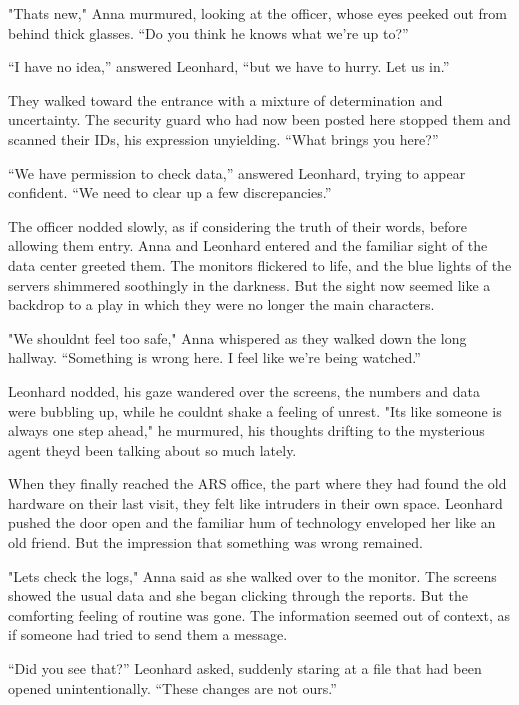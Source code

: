 \documentclass[
]{article}
\begin{document}
"That\textquotesingle s new," Anna murmured, looking at the officer,
whose eyes peeked out from behind thick glasses. ``Do you think he knows
what we're up to?''

``I have no idea,'' answered Leonhard, ``but we have to hurry. Let us
in.''

They walked toward the entrance with a mixture of determination and
uncertainty. The security guard who had now been posted here stopped
them and scanned their IDs, his expression unyielding. ``What brings you
here?''

``We have permission to check data,'' answered Leonhard, trying to
appear confident. ``We need to clear up a few discrepancies.''

The officer nodded slowly, as if considering the truth of their words,
before allowing them entry. Anna and Leonhard entered and the familiar
sight of the data center greeted them. The monitors flickered to life,
and the blue lights of the servers shimmered soothingly in the darkness.
But the sight now seemed like a backdrop to a play in which they were no
longer the main characters.

"We shouldn\textquotesingle t feel too safe," Anna whispered as they
walked down the long hallway. ``Something is wrong here. I feel like
we're being watched.''

Leonhard nodded, his gaze wandered over the screens, the numbers and
data were bubbling up, while he couldn\textquotesingle t shake a feeling
of unrest. "It\textquotesingle s like someone is always one step ahead,"
he murmured, his thoughts drifting to the mysterious agent
they\textquotesingle d been talking about so much lately.

When they finally reached the ARS office, the part where they had found
the old hardware on their last visit, they felt like intruders in their
own space. Leonhard pushed the door open and the familiar hum of
technology enveloped her like an old friend. But the impression that
something was wrong remained.

"Let\textquotesingle s check the logs," Anna said as she walked over to
the monitor. The screens showed the usual data and she began clicking
through the reports. But the comforting feeling of routine was gone. The
information seemed out of context, as if someone had tried to send them
a message.

``Did you see that?'' Leonhard asked, suddenly staring at a file that
had been opened unintentionally. ``These changes are not ours.''
\end{document}
